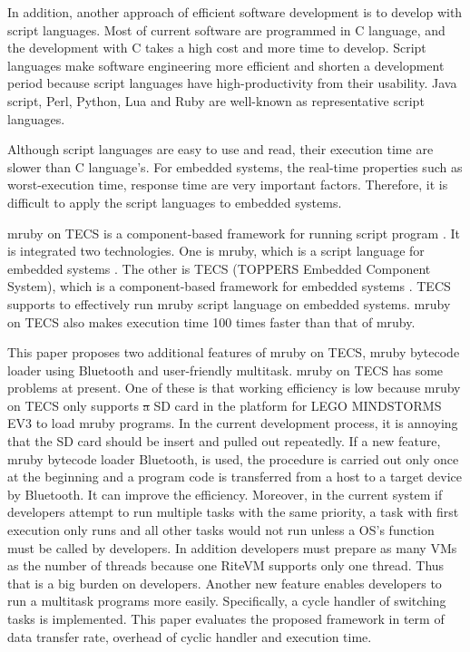 \documentclass[conference,compsoc]{IEEEtran}
\providecommand{\DIFadd}[1]{{\protect\color{blue}\uwave{#1}}} %
\providecommand{\DIFdel}[1]{{\protect\color{red}\sout{#1}}}                      %
\providecommand{\DIFaddbegin}{} %
\providecommand{\DIFaddend}{} %
\providecommand{\DIFdelbegin}{} %
\providecommand{\DIFdelend}{} %
\begin{document}
In addition, another approach of efficient software development is to develop with script languages.
Most of current software are programmed in C language, and the development with C takes a high cost and more time to develop.
Script languages make software engineering more efficient and shorten a development period because script languages have high-productivity from their usability.
Java script, Perl, Python, Lua and Ruby are well-known as representative script languages.

Although script languages are easy to use and read, their execution time are slower than C language's.
For embedded systems, the real-time properties such as worst-execution time, response time are very important factors.
Therefore, it is difficult to apply the script languages to embedded systems.

mruby on TECS is a component-based framework for running script program \cite{7153813}.
It is integrated two technologies.
One is mruby, which is a script language for embedded systems \cite{5959588}.
The other is TECS (TOPPERS Embedded Component System), which is a component-based framework for embedded systems \cite{4208825}.
TECS supports to effectively run mruby script language on embedded systems.
mruby on TECS also makes execution time 100 times faster than that of mruby.

This paper proposes two additional features of mruby on TECS, mruby bytecode loader using Bluetooth and user-friendly multitask.
mruby on TECS has some problems at present.
One of these is that working efficiency is low because mruby on TECS only supports \DIFdelbegin \DIFdel{a }\DIFdelend \DIFaddbegin \DIFadd{an }\DIFaddend SD card in the platform for LEGO MINDSTORMS EV3 to load mruby programs.
In the current development process, it is annoying that the SD card should be insert and pulled out repeatedly.
If a new feature, mruby bytecode loader Bluetooth, is used, the procedure is carried out only once at the beginning and a program code is transferred from a host to a target device by Bluetooth.
It can improve the efficiency.
Moreover, in the current system if developers attempt to run multiple tasks with the same priority, a task with first execution only runs and all other tasks would not run unless a OS's function must be called by developers.
In addition developers must prepare as many VMs as the number of threads because one RiteVM supports only one thread.
Thus that is a big burden on developers.
Another new feature enables developers to run a multitask programs more easily.
Specifically, a cycle handler of switching tasks is implemented.
This paper evaluates the proposed framework in term of data transfer rate, overhead of cyclic handler and execution time.
\end{document}
